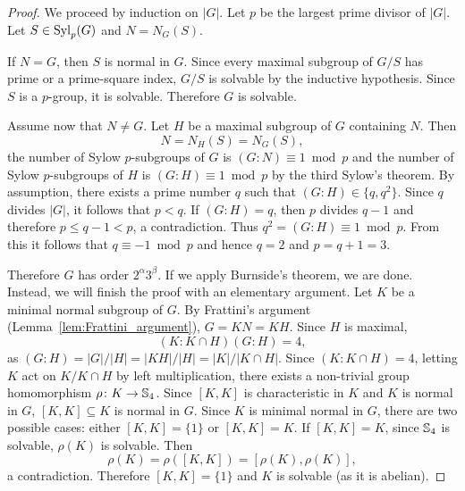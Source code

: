 \begin{proof}
We proceed by induction on $|G|$. Let $p$ be the largest prime divisor of $|G|$. Let 
$S\in\mathrm{Syl}_p(G)$ and $N=N_G(S)$. 

If $N=G$, then $S$ is normal in $G$. Since every 
maximal subgroup of $G/S$ has prime or a prime-square index, 
$G/S$ is solvable by the inductive hypothesis. Since $S$ is a $p$-group, it is solvable. 
Therefore $G$ is solvable. 

Assume now that $N\ne G$. Let $H$ be a maximal subgroup of $G$ containing $N$. Then 
\[
N=N_H(S)=N_G(S),
\]
the number of Sylow $p$-subgroups of $G$ is $(G:N)\equiv1\bmod p$  
and the number of Sylow $p$-subgroups of $H$ is $(G:H)\equiv1\bmod p$ 
by the third Sylow's theorem. By assumption, there exists a prime number $q$ 
such that 
$(G:H)\in\{q,q^2\}$. Since $q$ divides $|G|$, it follows that $p<q$. If $(G:H)=q$, then 
$p$ divides $q-1$ and therefore $p\leq q-1<p$, a contradiction. Thus $q^2=(G:H)\equiv 1\bmod p$.
From this it follows that $q\equiv -1\bmod p$ and hence $q=2$ and 
$p=q+1=3$. 

Therefore $G$ has order $2^\alpha 3^ \beta$. 
If we apply Burnside's theorem, we are done. Instead, we will finish the proof with an elementary argument. Let $K$ be a minimal normal subgroup of $G$.
By Frattini's argument (Lemma~\ref{lem:Frattini_argument}),  $G=KN=KH$. Since $H$ is maximal, 
\[
(K:K\cap H)(G:H)=4, 
\]
as $(G:H)=|G|/|H|=|KH|/|H|=|K|/|K\cap H|$. 
Since $(K:K\cap H)=4$, letting $K$ act on $K/K\cap H$ by left multiplication, there exists 
a non-trivial group homomorphism $\rho\colon K\to\mathbb{S}_4$. Since $[K,K]$ is characteristic in $K$ and $K$ is normal in $G$, $[K,K]\subseteq K$ is normal in $G$. Since $K$ is minimal normal in $G$, 
there are two possible cases: either $[K,K]=\{1\}$ or 
$[K,K]=K$. If $[K,K]=K$, 
since $\mathbb{S}_4$ is solvable, $\rho(K)$ is solvable. Then
\[
\rho(K)=\rho([K,K])=[\rho(K),\rho(K)],
\]
a contradiction. Therefore $[K,K]=\{1\}$ and $K$ is solvable (as it is abelian).
\end{proof}

	
